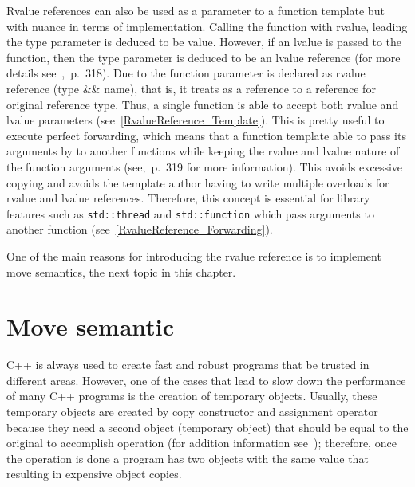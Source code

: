 \documentclass[11pt]{report}
\begin{document}
Rvalue references can also be used as a parameter to a function template but with nuance in terms of implementation. Calling the function with rvalue, leading the type parameter is deduced to be value. However, if an lvalue is passed to the function, then the type parameter is deduced to be an lvalue reference (for more details see~\cite{Williams:2012:CCA},~p.~318). Due to the function parameter is declared as rvalue reference (type \&\& name), that is, it treats as a reference to a reference for original reference type. Thus, a single function is able to accept both rvalue and lvalue parameters (see~\ref{RvalueReference_Template}). This is pretty useful to execute perfect forwarding, which means that a function template able to pass its arguments by to another functions while keeping the rvalue and lvalue nature of the function arguments (see\cite{Williams:2012:CCA},~p.~319 for more information). This avoids excessive copying and avoids the template author having to write multiple overloads for rvalue and lvalue references. Therefore, this concept is essential for library features such as \texttt{std::thread} and \texttt{std::function} which pass arguments to another function (see~\ref{RvalueReference_Forwarding}).

One of the main reasons for introducing the rvalue reference is to implement move semantics, the next topic in this chapter.

\section{Move semantic}
\label{section: Move semantic}
C++ is always used to create fast and robust programs that be trusted in different areas. However, one of the cases that lead to slow down the performance of many C++ programs is the creation of temporary objects. Usually, these temporary objects are created by copy constructor and assignment operator because they need a second object (temporary object) that should be equal to the original to accomplish operation (for addition information see~\cite{Stroustrup:2012:Cpp11}); therefore, once the operation is done a program has two objects with the same value that resulting in expensive object copies.
\end{document}
